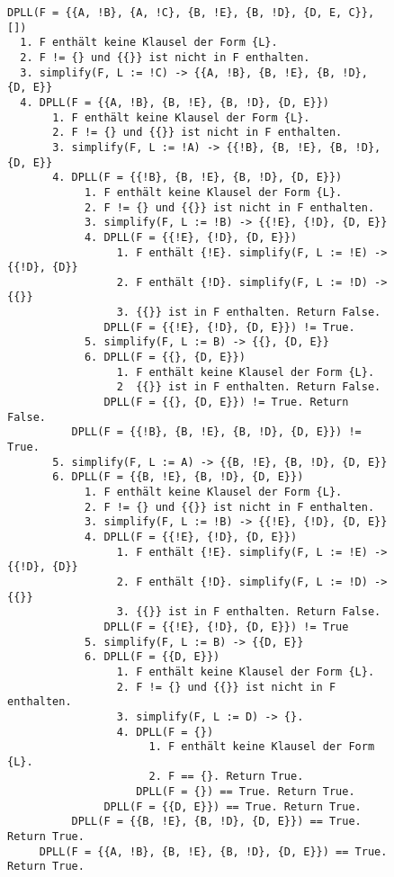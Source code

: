 \documentclass[10pt, oneside]{article}
\begin{document}
\begin{figure}[p]
    \caption{}
    \label{fig:1.c}
\begin{verbatim}
DPLL(F = {{A, !B}, {A, !C}, {B, !E}, {B, !D}, {D, E, C}}, [])
  1. F enthält keine Klausel der Form {L}.
  2. F != {} und {{}} ist nicht in F enthalten.
  3. simplify(F, L := !C) -> {{A, !B}, {B, !E}, {B, !D}, {D, E}}
  4. DPLL(F = {{A, !B}, {B, !E}, {B, !D}, {D, E}})
       1. F enthält keine Klausel der Form {L}.
       2. F != {} und {{}} ist nicht in F enthalten.
       3. simplify(F, L := !A) -> {{!B}, {B, !E}, {B, !D}, {D, E}}
       4. DPLL(F = {{!B}, {B, !E}, {B, !D}, {D, E}})
            1. F enthält keine Klausel der Form {L}.
            2. F != {} und {{}} ist nicht in F enthalten.
            3. simplify(F, L := !B) -> {{!E}, {!D}, {D, E}}
            4. DPLL(F = {{!E}, {!D}, {D, E}})
                 1. F enthält {!E}. simplify(F, L := !E) -> {{!D}, {D}}
                 2. F enthält {!D}. simplify(F, L := !D) -> {{}}
                 3. {{}} ist in F enthalten. Return False.
               DPLL(F = {{!E}, {!D}, {D, E}}) != True.
            5. simplify(F, L := B) -> {{}, {D, E}}
            6. DPLL(F = {{}, {D, E}})
                 1. F enthält keine Klausel der Form {L}.
                 2  {{}} ist in F enthalten. Return False.
               DPLL(F = {{}, {D, E}}) != True. Return False.
          DPLL(F = {{!B}, {B, !E}, {B, !D}, {D, E}}) != True.
       5. simplify(F, L := A) -> {{B, !E}, {B, !D}, {D, E}}
       6. DPLL(F = {{B, !E}, {B, !D}, {D, E}})
            1. F enthält keine Klausel der Form {L}.
            2. F != {} und {{}} ist nicht in F enthalten.
            3. simplify(F, L := !B) -> {{!E}, {!D}, {D, E}}
            4. DPLL(F = {{!E}, {!D}, {D, E}})
                 1. F enthält {!E}. simplify(F, L := !E) -> {{!D}, {D}}
                 2. F enthält {!D}. simplify(F, L := !D) -> {{}}
                 3. {{}} ist in F enthalten. Return False.
               DPLL(F = {{!E}, {!D}, {D, E}}) != True
            5. simplify(F, L := B) -> {{D, E}}
            6. DPLL(F = {{D, E}})
                 1. F enthält keine Klausel der Form {L}.
                 2. F != {} und {{}} ist nicht in F enthalten.
                 3. simplify(F, L := D) -> {}.
                 4. DPLL(F = {})
                      1. F enthält keine Klausel der Form {L}.
                      2. F == {}. Return True.
                    DPLL(F = {}) == True. Return True.
               DPLL(F = {{D, E}}) == True. Return True.
          DPLL(F = {{B, !E}, {B, !D}, {D, E}}) == True. Return True.
     DPLL(F = {{A, !B}, {B, !E}, {B, !D}, {D, E}}) == True. Return True.
\end{verbatim}
\end{figure}
\end{document}
